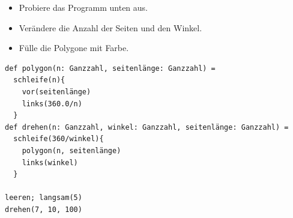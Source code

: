 \begin{itemize}

\item {Probiere das Programm unten aus.}
\item {Verändere die Anzahl der Seiten und den Winkel.}
\item {Fülle die Polygone mit Farbe.}

\end{itemize}



  

\begin{lstlisting}[basicstyle={\ttfamily\fontsize{16}{19}\selectfont},numbers=none]
def polygon(n: Ganzzahl, seitenlänge: Ganzzahl) = 
  schleife(n){
    vor(seitenlänge)
    links(360.0/n)
  }
def drehen(n: Ganzzahl, winkel: Ganzzahl, seitenlänge: Ganzzahl) = 
  schleife(360/winkel){ 
    polygon(n, seitenlänge) 
    links(winkel) 
  }

leeren; langsam(5)
drehen(7, 10, 100)
\end{lstlisting}
        
